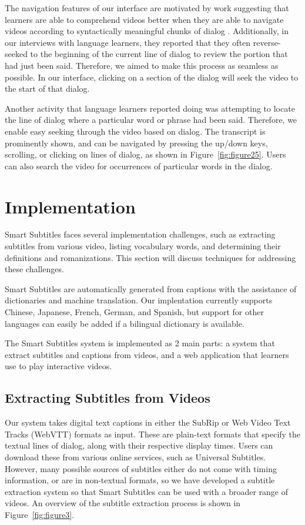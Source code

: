 \documentclass{sigchi}
\begin{document}
The navigation features of our interface are motivated by
work suggesting that learners are able to comprehend videos better when
they are able to navigate videos according to syntactically meaningful chunks of dialog \cite{shea2000leveling}.
Additionally, in our interviews with language learners, they reported
that they often reverse-seeked to the beginning of the current
line of dialog to review the portion that had just been said.
Therefore, we aimed to make this process as seamless as possible.
In our interface, clicking on a section of the dialog will
seek the video to the start of that dialog.

Another activity that language learners reported doing was attempting to locate the line of dialog where a particular word or phrase had been said. Therefore, we enable easy seeking through the video based on dialog. The transcript is prominently shown, and can be navigated by pressing the up/down keys, scrolling, or clicking on lines of dialog, as shown in Figure~\ref{fig:figure25}. Users can also search the video for occurrences of particular words in the dialog.

\section{Implementation}

Smart Subtitles faces several implementation challenges, such as extracting subtitles from various video, listing vocabulary words, and determining their definitions and romanizations. This section will discuss techniques for addressing these challenges.

Smart Subtitles are automatically generated from 
captions with the assistance of dictionaries and 
machine translation. Our implentation currently supports Chinese, Japanese, French, German, and Spanish, but support for other languages can easily be added if a bilingual dictionary is available.

The Smart Subtitles system
is implemented as 2 main parts:
a system that extract subtitles and captions from videos,
and a web application that learners use to play interactive videos.

\subsection{Extracting Subtitles from Videos}

Our system takes digital text captions in either the SubRip \cite{subrip} or Web Video Text Tracks (WebVTT) formats \cite{webvtt} as input.
These are plain-text formats that specify the textual lines of dialog, along with their respective display times.
Users can download these from
various online services, such as Universal Subtitles.
However, many possible sources of subtitles either
do not come with timing information, or are in
non-textual formats, so we have developed 
a subtitle extraction system so that Smart Subtitles
can be used with a broader range of videos.
An overview of the subtitle extraction process
is shown in Figure~\ref{fig:figure3}.
\end{document}
